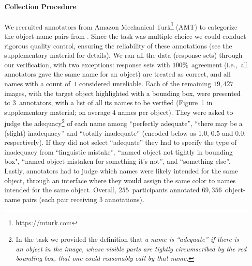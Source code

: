 \paragraph{Collection Procedure}
\label{sect:mn_verification}

We recruited annotators from Amazon Mechanical Turk\footnote{
	\url{https://mturk.com}
} (AMT) to categorize the object-name pairs from \mn.
Since the task was multiple-choice we could conduct rigorous quality control, ensuring the reliability of these annotations (see the supplementary material for details).
We ran all the \mn data (response sets) through our verification, with two exceptions: 
response sets with $100$\%~agreement (i.e.,~all annotators gave the same name for an object) are treated as correct, and all names with a count of~$1$ considered unreliable.
Each of the remaining $19,427$ images, with the target object highlighted with a bounding box, were presented to $3$~annotators, with a list of all its names to be verified (Figure~1 in supplementary material; on average $4$ names per object).
They were asked to judge the adequacy\footnote{
	In the task we provided the definition that \textit{a name is ``adequate'' if there is an object in the image, whose visible parts are tightly circumscribed by the red bounding box, that one could reasonably call by that name}.
} of each name among ``perfectly adequate'', ``there may be a (slight) inadequacy'' and ``totally inadequate'' (encoded below as 1.0, 0.5 and 0.0, respectively).
If they did not select ``adequate'' they had to specify the type of inadequacy from ``linguistic mistake'', ``named object not tightly in bounding box",  ``named object mistaken for something it's not'', and ``something else''.
Lastly, annotators had to judge which names were likely intended for the same object, through an interface where they would assign the same color to names intended for the same object.
Overall, $255$~participants annotated $69,356$~object-name pairs (each pair receiving 3 annotations).




